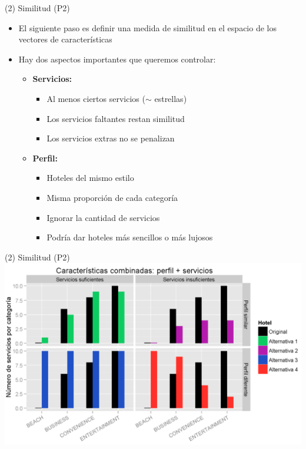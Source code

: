 \documentclass{beamer}
\begin{document}
\begin{frame}{(2) Similitud (P2)}
	\begin{itemize}%
		\item El siguiente paso es definir una medida de similitud en el espacio de los vectores de características
		\item Hay dos aspectos importantes que queremos controlar:
		\begin{itemize}
			\item \textbf{Servicios:}
			\begin{itemize}
				\item Al menos ciertos servicios ($\sim$ estrellas)
				\item Los servicios faltantes restan similitud
				\item Los servicios extras no se penalizan
			\end{itemize}
			\item \textbf{Perfil:}
			\begin{itemize}
				\item Hoteles del mismo estilo
				\item Misma proporción de cada categoría
				\item Ignorar la cantidad de servicios
				\item Podría dar hoteles más sencillos o más lujosos
			\end{itemize}
		\end{itemize}
	\end{itemize}
\end{frame}

\begin{frame}{(2) Similitud (P2)}
	\includegraphics[width=\textwidth]{imagenes/similitud.png}
\end{frame}
\end{document}
